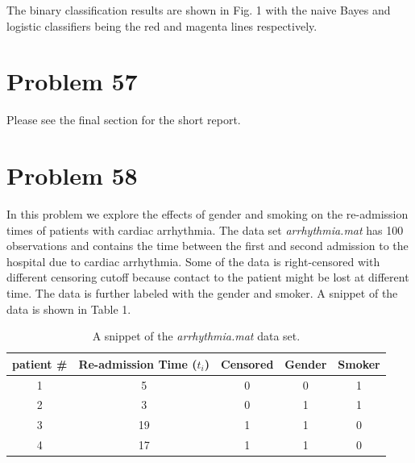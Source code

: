 \documentclass[a4paper, 11pt]{article}
\begin{document}
The binary classification results are shown in Fig. 1 with the naive Bayes and logistic classifiers being the red and magenta lines respectively. 




\section*{Problem 57}

Please see the final section for the short report. 

\section*{Problem 58}

In this problem we explore the effects of gender and smoking on the  re-admission times of patients with cardiac arrhythmia. The data set \textit{arrhythmia.mat} has 100 observations and contains the time between the first and second admission to the hospital due to cardiac arrhythmia. Some of the data is right-censored with different censoring cutoff because contact to the patient might be lost at different time. The data is further labeled with the gender and smoker. A snippet of the data is shown in Table 1. 

\begin{table}[]
\centering
\begin{tabular}{|c|c|c|c|c|}
\hline
patient \# & Re-admission Time ($t_i$) & Censored & Gender & Smoker \\ \hline
1          & 5                 & 0        & 0      & 1      \\ \hline
2          & 3                 & 0        & 1      & 1      \\ \hline
3          & 19                & 1        & 1      & 0      \\ \hline
4          & 17                & 1        & 1      & 0      \\ \hline
\end{tabular}
\caption{\label{tab:tab1} A snippet of the \textit{arrhythmia.mat} data set.}
\end{table}
\end{document}
